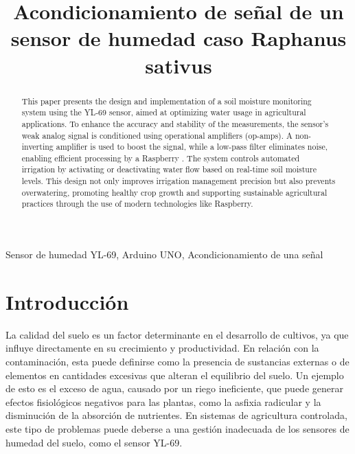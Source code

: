 \documentclass[conference]{IEEEtran}
\begin{document}
	
	\title{Acondicionamiento de señal de un sensor de humedad caso Raphanus sativus}
	\author{
		\and
		\and
	}
	\maketitle
	\begin{abstract}This paper presents the design and implementation of a soil moisture monitoring system using the YL-69 sensor, aimed at optimizing water usage in agricultural applications. To enhance the accuracy and stability of the measurements, the sensor’s weak analog signal is conditioned using operational amplifiers (op-amps). A non-inverting amplifier is used to boost the signal, while a low-pass filter eliminates noise, enabling efficient processing by a Raspberry . The system controls automated irrigation by activating or deactivating water flow based on real-time soil moisture levels. This design not only improves irrigation management precision but also prevents overwatering, promoting healthy crop growth and supporting sustainable agricultural practices through the use of modern technologies like Raspberry.
		
	\end{abstract}
	
	\begin{IEEEkeywords}
		Sensor de humedad YL-69, Arduino UNO, Acondicionamiento de una señal
	\end{IEEEkeywords}
	
	\section{Introducción}
	La calidad del suelo es un factor determinante en el desarrollo de cultivos, ya que influye directamente en su crecimiento y productividad. En relación con la contaminación, esta puede definirse como la presencia de sustancias externas o de elementos en cantidades excesivas que alteran el equilibrio del suelo. Un ejemplo de esto es el exceso de agua, causado por un riego ineficiente, que puede generar efectos fisiológicos negativos para las plantas, como la asfixia radicular y la disminución de la absorción de nutrientes. En sistemas de agricultura controlada, este tipo de problemas puede deberse a una gestión inadecuada de los sensores de humedad del suelo, como el sensor YL-69.
	
\end{document}
